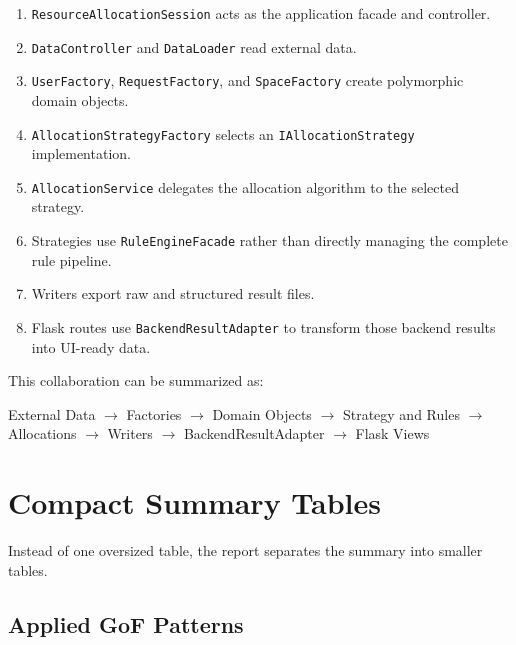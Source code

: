 \documentclass[12pt,a4paper]{article}
\begin{document}
\begin{enumerate}
    \item \texttt{ResourceAllocationSession} acts as the application facade and
    controller.

    \item \texttt{DataController} and \texttt{DataLoader} read external data.

    \item \texttt{UserFactory}, \texttt{RequestFactory}, and
    \texttt{SpaceFactory} create polymorphic domain objects.

    \item \texttt{AllocationStrategyFactory} selects an
    \texttt{IAllocationStrategy} implementation.

    \item \texttt{AllocationService} delegates the allocation algorithm to the
    selected strategy.

    \item Strategies use \texttt{RuleEngineFacade} rather than directly
    managing the complete rule pipeline.

    \item Writers export raw and structured result files.

    \item Flask routes use \texttt{BackendResultAdapter} to transform those
    backend results into UI-ready data.
\end{enumerate}

This collaboration can be summarized as:

\begin{center}
External Data
$\rightarrow$
Factories
$\rightarrow$
Domain Objects
$\rightarrow$
Strategy and Rules
$\rightarrow$
Allocations
$\rightarrow$
Writers
$\rightarrow$
BackendResultAdapter
$\rightarrow$
Flask Views
\end{center}

\section{Compact Summary Tables}

Instead of one oversized table, the report separates the summary into smaller
tables.

\subsection{Applied GoF Patterns}
\end{document}
